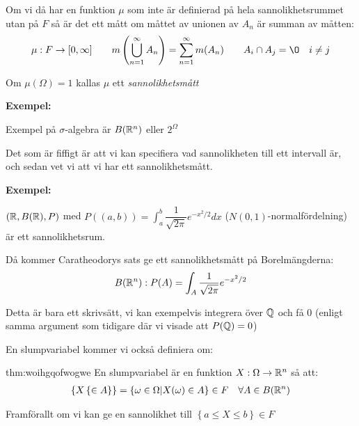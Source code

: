 \par\bigskip
\noindent Om vi då har en funktion $\mu$ som inte är definierad på hela sannolikhetsrummet utan på $F$ så är det ett mått om måttet av unionen av $A_n$ är summan av måtten:
\begin{equation*}
  \begin{gathered}
    \mu:F\to[0,\infty]\qquad m\left(\bigcup_{n=1}^{\infty}A_n\right) = \sum_{n=1}^{\infty}m(A_n)\qquad A_i\cap A_j = \O\quad i\neq j
  \end{gathered}
\end{equation*}\par
\noindent Om $\mu(\Omega) = 1$ kallas $\mu$ ett \textit{sannolikhetsmått}
\par\bigskip
\noindent\textbf{Exempel:}\par
\noindent Exempel på $\sigma$-algebra är $B(\mathbb{R}^n)$ eller $2^\Omega$
\par\bigskip
\noindent Det som är fiffigt är att vi kan specifiera vad sannolikheten till ett intervall är, och sedan vet vi att vi har ett sannolikhetsmått.
\par\bigskip
\noindent\textbf{Exempel:}\par
\noindent $(\mathbb{R},B(\mathbb{R}),P)$ med $P((a,b)) = \int_{a}^{b}\dfrac{1}{\sqrt{2\pi}}e^{-x^2/2}dx$ ($N(0,1)$-normalfördelning) är ett sannolikhetsrum.\par
\noindent Då kommer Caratheodorys sats ge ett sannolikhetsmått på Borelmängderna:
\begin{equation*}
  \begin{gathered}
    B(\mathbb{R}^n): P(A) = \int_{A}\dfrac{1}{\sqrt{2\pi}}e^{-x^2/2}
  \end{gathered}
\end{equation*}\par
\noindent Detta är bara ett skrivsätt, vi kan exempelvis integrera över $\mathbb{Q}$ och få 0 (enligt samma argument som tidigare där vi visade att $P(\mathbb{Q}) = 0$)
\par\bigskip
\noindent En slumpvariabel kommer vi också definiera om:
\begin{theo}[Slumpvariabel V2]{thm:woihgqofwogwe}
  En slumpvariabel är en funktion $X:\Omega\to\mathbb{R}^n$ så att:
  \begin{equation*}
    \begin{gathered}
    \left\{X\left\{\in A\right\}\right\} = \left\{\omega\in\Omega|X(\omega)\in A\right\}\in F\quad \forall A\in B(\mathbb{R}^n)
    \end{gathered}
  \end{equation*}\par
  \noindent Framförallt om vi kan ge en sannolikhet till $\left\{a\leq X\leq b\right\}\in F$
\end{theo}

